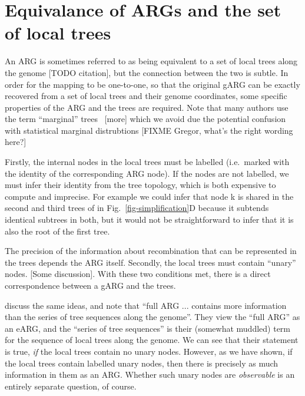 \documentclass{article}
\begin{document}

\section*{Equivalance of ARGs and the set of local trees}
An ARG is sometimes referred to as being equivalent to a set of
local trees along the genome [TODO citation], but the connection
between the two is subtle.
In order for the mapping to be one-to-one, so that the original
gARG can be exactly recovered from a set of local trees and
their genome coordinates,
some specific properties of the ARG and the trees are required.
Note that many authors use the term ``marginal''
trees~\citep[e.g.][]{griffiths1996ancestral,minichiello2006mapping} [more]
which we avoid due the potential confusion with statistical
marginal distrubtions [FIXME Gregor, what's the right wording here?]

Firstly, the internal nodes in the local trees must be labelled
(i.e.\ marked with the identity of the corresponding ARG node).
If the nodes are not labelled, we must infer their identity
from the tree topology, which is both
expensive to compute and imprecise. For example
we could infer that node \textsf{k} is shared in the second
and third trees of in Fig.~\ref{fig-simplification}D
because it subtends identical subtrees in both,
but it would not be straightforward to infer that it
is also the root of the first tree.

The precision of the information about recombination that
can be represented in the trees depends the ARG itself.
Secondly, the local trees must contain ``unary'' nodes.
[Some discussion].
With these two conditions met, there is a direct correspondence
between a gARG and the trees.

\cite{shipilina2023origin} discuss the same ideas, and note that
``full ARG ... contains more information than the series of tree
sequences along the genome''. They view the ``full ARG'' as an
eARG, and the ``series of tree sequences'' is their
(somewhat muddled)
term for the sequence of local trees along the genome. We can see
that their statement is true, \emph{if} the local trees contain
no unary nodes. However, as we have shown, if the local trees
contain labelled unary nodes, then  there is precisely as
much information in them as an ARG. Whether such unary nodes
are \emph{observable} is an entirely separate question,
of course.
\end{document}
